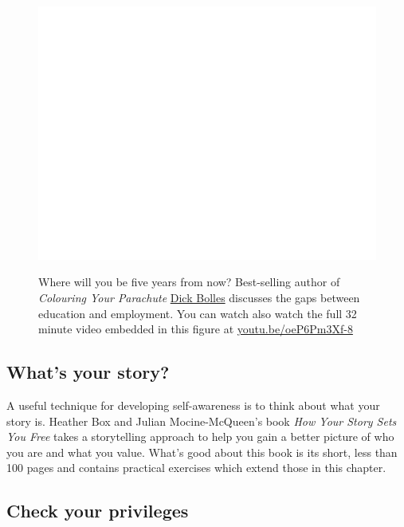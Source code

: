 \documentclass[
]{book}
\begin{document}
\begin{figure}

{\centering \href{https://www.youtube.com/embed/oeP6Pm3Xf-8}{\includegraphics[width=0.99\linewidth]{cdyf_files/figure-latex/bolles-fig-1} }

}

\caption{Where will you be five years from now? Best-selling author of \emph{Colouring Your Parachute} \href{https://en.wikipedia.org/wiki/Richard_Nelson_Bolles}{Dick Bolles} discusses the gaps between education and employment. You can watch also watch the full 32 minute video embedded in this figure at \href{https://youtu.be/oeP6Pm3Xf-8}{youtu.be/oeP6Pm3Xf-8} \citep{youtube-bolles}}\label{fig:bolles-fig}
\end{figure}



\hypertarget{freeyourstory}{%
\subsection{What's your story?}\label{freeyourstory}}

A useful technique for developing self-awareness is to think about what your story is. Heather Box and Julian Mocine-McQueen's book \emph{How Your Story Sets You Free} \citep{freeyourstory} takes a storytelling approach to help you gain a better picture of who you are and what you value. What's good about this book is its short, less than 100 pages and contains practical exercises which extend those in this chapter.

\hypertarget{privileged}{%
\subsection{Check your privileges}\label{privileged}}
\end{document}
